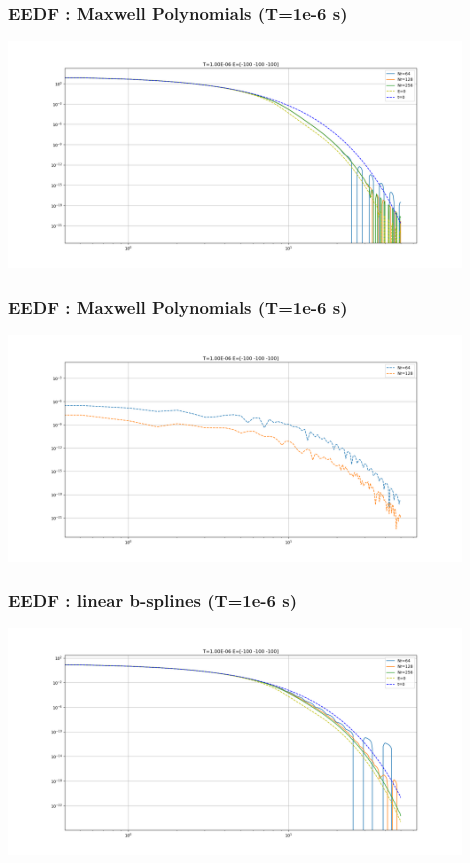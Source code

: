 \documentclass[mathserif, aspectratio=169]{beamer}
\begin{document}
\begin{frame}
	\frametitle{EEDF : Maxwell Polynomials (T=1e-6 s)}
	\begin{center}
		\includegraphics[width=0.9\textwidth]{figures/g0_1_maxwell_eedf.png}
	\end{center}
\end{frame}

\begin{frame}
	\frametitle{EEDF : Maxwell Polynomials (T=1e-6 s)}
	\begin{center}
		\includegraphics[width=0.9\textwidth]{figures/g0_1_maxwell_eedf_conv.png}
	\end{center}
\end{frame}

\begin{frame}
	\frametitle{EEDF : linear b-splines (T=1e-6 s)}
	\begin{center}
		\includegraphics[width=0.9\textwidth]{figures/g0_1_bspline_eedf.png}
	\end{center}
\end{frame}
\end{document}
